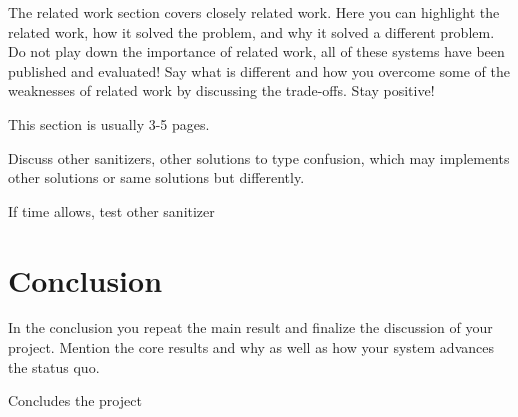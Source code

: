 \documentclass[a4paper,11pt,oneside]{report}
\begin{document}
The related work section covers closely related work. Here you can highlight
the related work, how it solved the problem, and why it solved a different
problem. Do not play down the importance of related work, all of these
systems have been published and evaluated! Say what is different and how
you overcome some of the weaknesses of related work by discussing the 
trade-offs. Stay positive!

This section is usually 3-5 pages.

Discuss other sanitizers, other solutions to type confusion,
which may implements other solutions or same solutions but differently.

If time allows, test other sanitizer




\chapter{Conclusion}

In the conclusion you repeat the main result and finalize the discussion of
your project. Mention the core results and why as well as how your system
advances the status quo.

Concludes the project 
\cleardoublepage
{}
{}
\printbibliography

%
%
\end{document}
